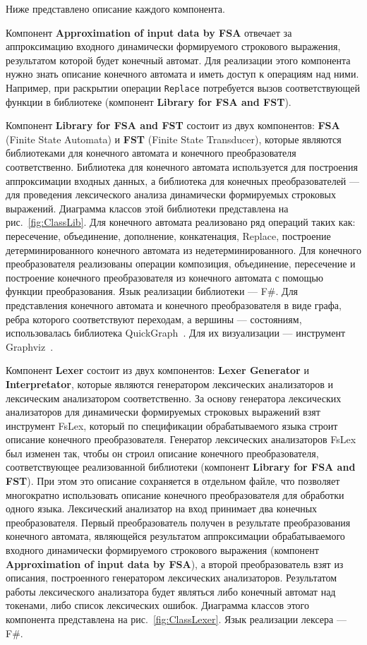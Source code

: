 \documentclass{matmex-diploma}
\begin{document}
Ниже представлено описание каждого компонента. 

Компонент \textbf{Approximation of input data by FSA} отвечает за аппроксимацию входного динамически формируемого строкового выражения, результатом которой будет конечный автомат. Для реализации этого компонента нужно знать описание конечного автомата и иметь доступ к операциям над ними. Например, при раскрытии операции \verb|Replace| потребуется вызов соответствующей функции в библиотеке (компонент \textbf{Library for FSA and FST}). 

Компонент \textbf{Library for FSA and FST} состоит из двух компонентов: \textbf{FSA} (Finite State Automata) и \textbf{FST} (Finite State Transducer), которые являются библиотеками для конечного автомата и конечного преобразователя соответственно. Библиотека для конечного автомата используется для построения аппроксимации входных данных, а библиотека для конечных преобразователей --- для проведения лексического анализа динамически формируемых строковых выражений. Диаграмма классов этой библиотеки представлена на рис.~\ref{fig:ClassLib}. Для конечного автомата реализовано ряд операций таких как: пересечение, объединение, дополнение, конкатенация, Replace, построение детерминированного конечного автомата из недетерминированного. Для конечного преобразователя реализованы операции композиция, объединение, пересечение и построение конечного преобразователя из конечного автомата с помощью функции преобразования. Язык реализации библиотеки --- F\#. Для представления конечного автомата и конечного преобразователя в виде графа, ребра которого соответствуют переходам, а вершины --- состояниям, использовалась библиотека QuickGraph~\cite{QuickGraph}. Для их визуализации --- инструмент Graphviz~\cite{Graphviz}.

Компонент \textbf{Lexer} состоит из двух компонентов: \textbf{Lexer Generator} и \textbf{Interpretator}, которые являются генератором лексических анализаторов и лексическим анализатором соответственно. За основу генератора лексических анализаторов для динамически формируемых строковых выражений взят инструмент FsLex, который по спецификации обрабатываемого языка строит описание конечного преобразователя. Генератор лексических анализаторов FsLex был изменен так, чтобы он строил описание конечного преобразователя, соответствующее реализованной библиотеки (компонент \textbf{Library for FSA and FST}). При этом это описание сохраняется в отдельном файле, что позволяет многократно использовать описание конечного преобразователя для обработки одного языка. Лексический анализатор на вход принимает два конечных преобразователя. Первый преобразователь получен в результате преобразования конечного автомата, являющейся результатом аппроксимации обрабатываемого входного динамически формируемого строкового выражения (компонент \textbf{Approximation of input data by FSA}), а второй преобразователь взят из описания, построенного генератором лексических анализаторов. Результатом работы лексического анализатора будет являться либо конечный автомат над токенами, либо список лексических ошибок. Диаграмма классов этого компонента представлена на рис.~\ref{fig:ClassLexer}. Язык реализации лексера --- F\#.
\end{document}
